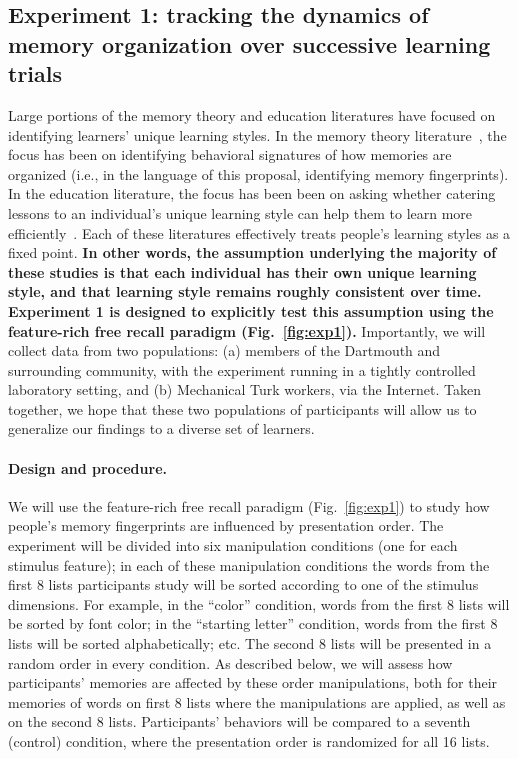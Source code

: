 \subsection*{Experiment 1: tracking the dynamics of memory organization over successive learning trials}
Large portions of the memory theory and education literatures have focused on identifying learners' unique learning styles.  In the memory theory literature~\citep{SmitVela01, Kaha12, HealKaha14a, MannEtal15}, the focus has been on identifying behavioral signatures of how memories are organized (i.e., in the language of this proposal, identifying memory fingerprints).  In the education literature, the focus has been been on asking whether catering lessons to an individual's unique learning style can help them to learn more efficiently~\citep{PashEtal08}.  Each of these literatures effectively treats people's learning styles as a fixed point.  \textbf{In other words, the assumption underlying the majority of these studies is that each individual has their own unique learning style, and that learning style remains roughly consistent over time.  Experiment 1 is designed to explicitly test this assumption using the feature-rich free recall paradigm (Fig.~\ref{fig:exp1}).}  Importantly, we will collect data from two populations: (a) members of the Dartmouth and surrounding community, with the experiment running in a tightly controlled laboratory setting, and (b) Mechanical Turk workers, via the Internet.  Taken together, we hope that these two populations of participants will allow us to generalize our findings to a diverse set of learners.

\paragraph{Design and procedure.}
We will use the feature-rich free recall paradigm (Fig.~\ref{fig:exp1}) to study how people's memory fingerprints are influenced by presentation order.  The experiment will be divided into six manipulation conditions (one for each stimulus feature); in each of these manipulation conditions the words from the first 8 lists participants study will be sorted according to one of the stimulus dimensions.  For example, in the ``color'' condition, words from the first 8 lists will be sorted by font color; in the ``starting letter'' condition, words from the first 8 lists will be sorted alphabetically; etc.  The second 8 lists will be presented in a random order in every condition.  As described below, we will assess how participants' memories are affected by these order manipulations, both for their memories of words on first 8 lists where the manipulations are applied, as well as on the second 8 lists.  Participants' behaviors will be compared to a seventh (control) condition, where the presentation order is randomized for all 16 lists.


